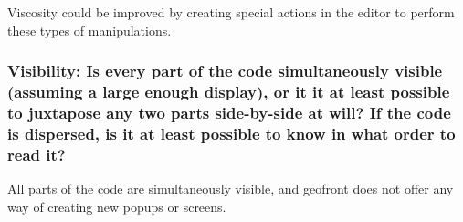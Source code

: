 Viscosity could be improved by creating special actions in the editor to perform these types of manipulations.  

\subsubsection*{Visibility: Is every part of the code simultaneously visible (assuming a large enough display), or it it at least possible to juxtapose any two parts side-by-side at will? If the code is dispersed, is it at least possible to know in what order to read it?}

All parts of the code are simultaneously visible, and geofront does not offer any way of creating new popups or screens.


















